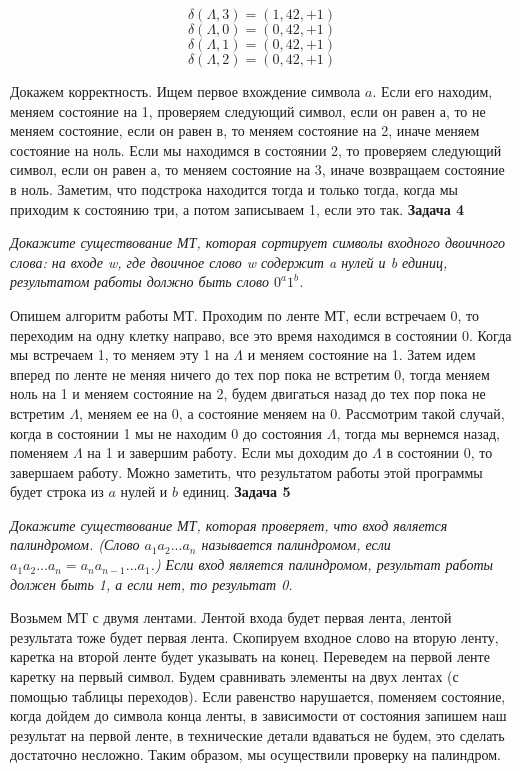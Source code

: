 \documentclass{article}
\begin{document}
$$\delta(\Lambda,3)=(1,42,+1)$$
$$\delta(\Lambda,0)=(0,42,+1)$$
$$\delta(\Lambda,1)=(0,42,+1)$$
$$\delta(\Lambda,2)=(0,42,+1)$$

Докажем корректность. Ищем первое вхождение символа $a$. Если его находим, меняем состояние на 1, проверяем следующий символ, если он равен а, то не меняем состояние, если он равен в, то меняем состояние на 2, иначе меняем состояние на ноль. Если мы находимся в состоянии 2, то проверяем следующий символ, если он равен а, то меняем состояние на 3, иначе возвращаем состояние в ноль. Заметим, что подстрока находится тогда и только тогда, когда мы приходим к состоянию три, а потом записываем 1, если это так. 
\newline
\newline
 \noindent \textbf{Задача 4}
\begin{center}
\textit{Докажите существование МТ, которая сортирует символы входного двоичного слова: на входе w,
где двоичное слово w содержит a нулей и b единиц, результатом работы должно быть слово $0^a1^b$.}
\end{center}
Опишем алгоритм работы МТ. Проходим по ленте МТ, если встречаем 0, то переходим на одну клетку направо, все это время находимся в состоянии 0. Когда мы встречаем 1, то меняем эту 1 на $\Lambda$ и меняем состояние на 1. Затем идем вперед по ленте не меняя ничего до тех пор пока не встретим 0, тогда меняем ноль на 1 и меняем состояние на 2, будем двигаться назад до тех пор пока не встретим $\Lambda$, меняем ее на 0, а состояние меняем на 0. Рассмотрим такой случай, когда в состоянии 1 мы не находим 0 до состояния $\Lambda$, тогда мы вернемся назад, поменяем $\Lambda$ на 1 и завершим работу. Если мы доходим до $\Lambda$ в состоянии 0, то завершаем работу. Можно заметить, что результатом работы этой программы будет строка из $a$ нулей и $b$ единиц. 
\newline \newline
 \noindent \textbf{Задача 5}
\begin{center}
\textit{Докажите существование МТ, которая проверяет, что вход является палиндромом. (Слово $a_1a_2 . . . a_n$ называется палиндромом, если $a_1a_2 . . . a_n = a_na_{n-1} . . . a_1$.) Если вход является палиндромом, результат работы должен быть 1, а если нет, то результат 0.} 
\end{center}
Возьмем МТ с двумя лентами. Лентой входа будет первая лента, лентой результата тоже будет первая лента. Скопируем входное слово на вторую ленту, каретка на второй ленте будет указывать на конец. Переведем на первой ленте каретку на первый символ. Будем сравнивать элементы на двух лентах (с помощью таблицы переходов). Если равенство нарушается, поменяем состояние, когда дойдем до символа конца ленты, в зависимости от состояния запишем наш результат на первой ленте, в технические детали вдаваться не будем, это сделать достаточно несложно. Таким образом, мы осуществили  проверку на палиндром.
\end{document}
